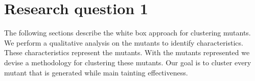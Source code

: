 \documentclass[../main]{subfiles}
\begin{document}
\chapter{Research question 1}
\label{ch:reserach_question1}
The following sections describe the white box approach for clustering mutants.
We perform a qualitative analysis on the mutants to identify characteristics. 
These characteristics represent the mutants.
With the mutants represented we devise a methodology for clustering these mutants.
Our goal is to cluster every mutant that is generated while main tainting effectiveness.


\end{document}
